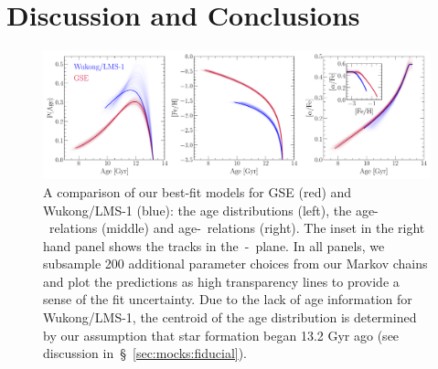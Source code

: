 
\section{Discussion and Conclusions}
\label{sec:conclusions}

\begin{figure}
\centering
\includegraphics[scale = 0.45]{gse_wukong_comparison.pdf}
\caption{
A comparison of our best-fit models for GSE (red) and Wukong/LMS-1 (blue): the
age distributions (left), the age-\feh~relations (middle) and age-\afe~relations
(right).
The inset in the right hand panel shows the tracks in the~\afe-\feh~plane.
In all panels, we subsample 200 additional parameter choices from our Markov
chains and plot the predictions as high transparency lines to provide a sense
of the fit uncertainty.
Due to the lack of age information for Wukong/LMS-1, the centroid of the age
distribution is determined by our assumption that star formation began 13.2
Gyr ago (see discussion in~\S~\ref{sec:mocks:fiducial}).
}
\label{fig:comparison}
\end{figure}

